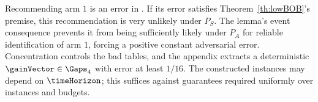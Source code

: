 Recommending arm $1$ is an error in \stoPro{}.
If its error satisfies Theorem~\ref{th:lowBOB}'s premise, this
recommendation is very unlikely under $P_S$. The lemma's event
consequence prevents it from being sufficiently likely under $P_A$
for reliable identification of arm $1$, forcing a positive constant
adversarial error. Concentration controls the bad tables, and the
appendix extracts a deterministic $\gainVector\in\Gaps_4$ with error
at least $1/16$.
The constructed instances may depend on $\timeHorizon$; this suffices
against guarantees required uniformly over instances and budgets.
%